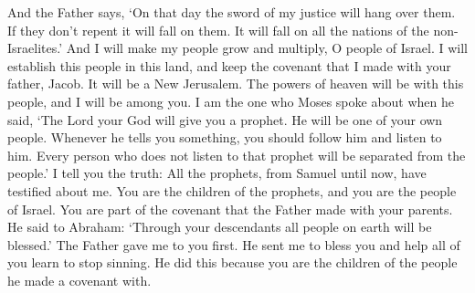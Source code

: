 And the Father says, \lq On that day the sword of my justice will hang over them. If they don't repent it will fall on them. It will fall on all the nations of the non-Israelites.\rq
\bverse \iffalse And it shall come to pass that I will establish my people, O house of Israel. \fi
And I will make my people grow and multiply, O people of Israel.
\bverse \iffalse And behold, this people will I establish in this land, unto the fulfilling of the covenant which I made with your father Jacob; and it shall be a New Jerusalem. And the powers of heaven shall be in the midst of this people; yea, even I will be in the midst of you. \fi
I will establish this people in this land, and keep the covenant that I made with your father, Jacob. It will be a New Jerusalem. The powers of heaven will be with this people, and I will be among you.
\bverse \iffalse Behold, I am he of whom Moses spake, saying: A prophet shall the Lord your God raise up unto you of your brethren, like unto me; him shall ye hear in all things whatsoever he shall say unto you. And it shall come to pass that every soul who will not hear that prophet shall be cut off from among the people. \fi
I am the one who Moses spoke about when he said, \lq The Lord your God will give you a prophet. He will be one of your own people. Whenever he tells you something, you should follow him and listen to him. Every person who does not listen to that prophet will be separated from the people.\rq
\bverse \iffalse Verily I say unto you, yea, and all the prophets from Samuel and those that follow after, as many as have spoken, have testified of me. \fi
I tell you the truth: All the prophets, from Samuel until now, have testified about me.
\bverse \iffalse And behold, ye are the children of the prophets; and ye are of the house of Israel; and ye are of the covenant which the Father made with your fathers, saying unto Abraham: And in thy seed shall all the kindreds of the earth be blessed. \fi
You are the children of the prophets, and you are the people of Israel. You are part of the covenant that the Father made with your parents. He said to Abraham: \lq Through your descendants all people on earth will be blessed.\rq
\bverse \iffalse The Father having raised me up unto you first, and sent me to bless you in turning away every one of you from his iniquities; and this because ye are the children of the covenant-- \fi
The Father gave me to you first. He sent me to bless you and help all of you learn to stop sinning. He did this because you are the children of the people he made a covenant with.
